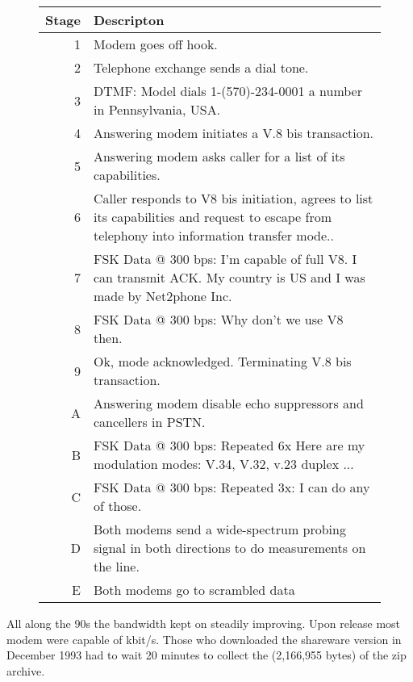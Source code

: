  \begin{figure}[H]
\centering  
\begin{tabularx}{\textwidth}{ R{0.1} L{1.9} }
  \toprule
  \textbf{Stage} &  \textbf{Descripton} \\
  \toprule 
   
   1 & Modem goes off hook.\\
   2 & Telephone exchange sends a dial tone.\\
   3 & DTMF: Model dials 1-(570)-234-0001 a number in Pennsylvania, USA.\\
   4 & Answering modem initiates a V.8 bis transaction.\\
   5 & Answering modem asks caller for a list of its capabilities.\\
   6 & Caller responds to V8 bis initiation, agrees to list its capabilities and request to escape from telephony into information transfer mode..\\
   7 & FSK Data @ 300 bps: I'm capable of full V8. I can transmit ACK. My country is US and I was made by Net2phone Inc.\\
   8 & FSK Data @ 300 bps: Why don't we use V8 then.\\
   9 & Ok, mode acknowledged. Terminating V.8 bis transaction.\\
   \toprule 
   A & Answering modem disable echo suppressors and cancellers in PSTN.\\
   B & FSK Data @ 300 bps: Repeated 6x Here are my modulation modes: V.34, V.32, v.23 duplex ...\\
   C & FSK Data @ 300 bps: Repeated 3x: I can do any of those. \\
   D & Both modems send a wide-spectrum probing signal in both directions to do measurements on the line.\\
   E & Both modems go to scrambled data \\
   \toprule
\end{tabularx}
\caption{}
\end{figure}
\par




All along the 90s the bandwidth kept on steadily improving. Upon \doom release most modem were capable of kbit/s. Those who downloaded the shareware version in December 1993 had to wait 20 minutes to collect the (2,166,955 bytes) of the zip archive.\\
\par

